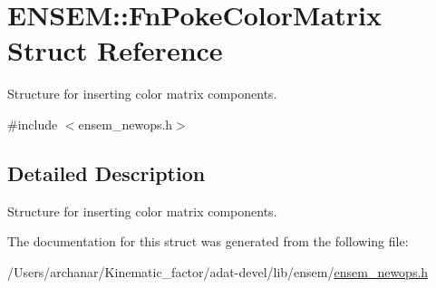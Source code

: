 \hypertarget{structENSEM_1_1FnPokeColorMatrix}{}\section{E\+N\+S\+EM\+:\+:Fn\+Poke\+Color\+Matrix Struct Reference}
\label{structENSEM_1_1FnPokeColorMatrix}


Structure for inserting color matrix components.  




{\ttfamily \#include $<$ensem\+\_\+newops.\+h$>$}



\subsection{Detailed Description}
Structure for inserting color matrix components. 

The documentation for this struct was generated from the following file\+:\begin{DoxyCompactItemize}
\item 
/\+Users/archanar/\+Kinematic\+\_\+factor/adat-\/devel/lib/ensem/\mbox{\hyperlink{adat-devel_2lib_2ensem_2ensem__newops_8h}{ensem\+\_\+newops.\+h}}\end{DoxyCompactItemize}
